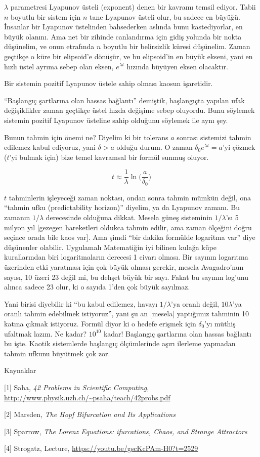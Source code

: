 \documentclass[12pt,fleqn]{article}\usepackage{../../common}
\begin{document}
$\lambda$ parametresi Lyapunov üsteli (exponent) denen bir kavramı temsil
ediyor. Tabii $n$ boyutlu bir sistem için $n$ tane Lyapunov üsteli olur, bu
sadece en büyüğü. İnsanlar bir Lyapunov üstelinden bahsederken aslında bunu
kastediyorlar, en büyük olanını. Ama net bir zihinde canlandırma için gidiş
yolunda bir nokta düşünelim, ve onun etrafında $n$ boyutlu bir belirsizlik
küresi düşünelim. Zaman geçtikçe o küre bir elipsoid'e dönüşür, ve bu
elipsoid'in en büyük ekseni, yani en hızlı üstel ayrıma sebep olan eksen,
$e^{\lambda t}$ hızında büyüyen eksen olacaktır.

Bir sistemin pozitif Lyapunov üstele sahip olması kaosun işaretidir.

``Başlangıç şartlarına olan hassas bağlantı'' demiştik, başlangıçta yapılan
ufak değişiklikler zaman geçtikçe üstel hızda değişime sebep oluyordu. Bunu
söylemek sistemin pozitif Lyapunov üsteline sahip olduğunu söylemek ile
aynı şey.

Bunun tahmin için önemi ne? Diyelim ki bir tolerans $a$ sonrası sistemizi
tahmin edilemez kabul ediyoruz, yani $\delta > a$ olduğu durum. O zaman
$\delta_0 e^{\lambda t} = a$'yi çözmek ($t$'yi bulmak için) bize temel
kavramsal bir formül sunmuş oluyor. 

$$ t \approx \frac{1}{\lambda} \ln \bigg( \frac{a}{\delta_0}\bigg) $$

$t$ tahminlerin işleyeceği zaman noktası, ondan sonra tahmin mümkün değil,
ona ``tahmin ufku (predictability horizon)'' diyelim, ya da Lyapunov
zamanı. Bu zamanın $1/\lambda$ derecesinde olduğuna dikkat. Mesela güneş
sisteminin $1/\lambda$'sı 5 milyon yıl [gezegen hareketleri oldukca tahmin
edilir, ama zaman ölçeğini doğru seçince orada bile kaos var]. Ama şimdi
``bir dakika formülde logaritma var'' diye düşünenler olabilir. Uygulamalı
Matematiğin iyi bilinen kulağa küpe kurallarından biri logaritmaların
derecesi 1 civarı olması. Bir sayının logarıtma üzerinden etki yaratması
için çok büyük olması gerekir, mesela Avagadro'nun sayısı, 10 üzeri 23
değil mi, bu dehşet büyük bir sayı. Fakat bu sayının log'unu alınca sadece
23 olur, ki o sayıda 1'den çok büyük sayılmaz.

Yani birisi diyebilir ki ``bu kabul edilemez, havayı $1/\lambda$'ya oranlı
değil, $10 \lambda$'ya oranlı tahmin edebilmek istiyoruz'', yani şu an
[mesela] yaptığımız tahminin 10 katına çıkmak istiyoruz. Formül diyor ki o
hedefe erişmek için $\delta_0$'yı müthiş ufaltmak lazım. Ne kadar?
$10^{10}$ kadar! Başlangıç şartlarına olan hassas bağlantı bu işte. Kaotik
sistemlerde başlangıç ölçümlerinde aşırı ilerleme yapmadan tahmin ufkunu
büyütmek çok zor.

Kaynaklar

[1] Saha, {\em 42 Problems in Scientific Computing}, \url{http://www.physik.uzh.ch/~psaha/teach/42probs.pdf}

[2] Marsden, {\em The Hopf Bifurcation and Its Applications}

[3] Sparrow, {\em The Lorenz Equations: ifurcations, Chaos, and Strange Attractors}

[4] Strogatz, Lecture, \url{https://youtu.be/gscKcPAm-H0?t=2529}
\end{document}
